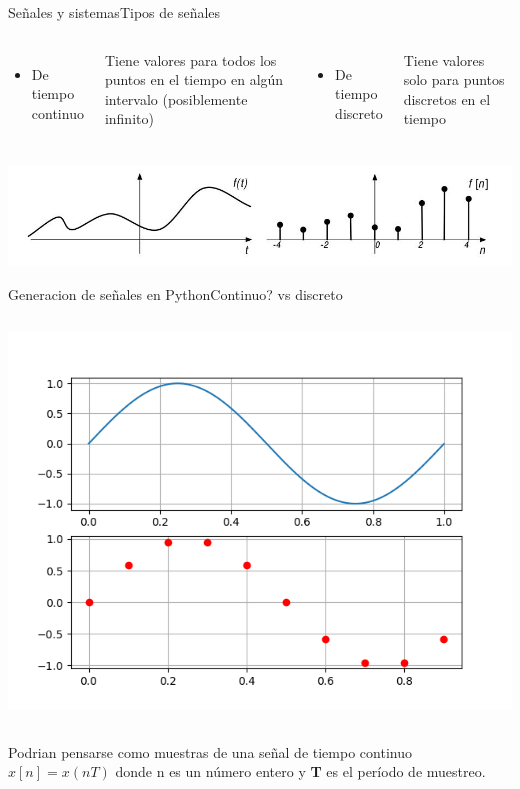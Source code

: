  \begin{frame}{Señales y sistemas}{Tipos de señales}
    \begin{columns}[onlytextwidth]
       \begin{itemize}
          \item{De tiempo continuo}
       \end{itemize}
       Tiene valores para todos los puntos en el tiempo en algún intervalo (posiblemente infinito)
       \begin{itemize}
          \item{De tiempo discreto}
       \end{itemize}
       Tiene valores solo para puntos discretos en el tiempo
    \end{columns}
    \vfill
    \includegraphics[width=\textwidth]{1_clase/continuo_vs_discreto}
 \end{frame}
 \begin{frame}{Generacion de señales en Python}{Continuo? vs discreto}
    \begin{columns}[onlytextwidth]
       
       \includegraphics[width=\textwidth]{1_clase/python_continuo_vs_discreto}
    \end{columns}
    Podrian pensarse como muestras de una señal de tiempo continuo $x[n] = x (nT)$ donde n es un número entero y \textbf{T} es el período de muestreo.
    \vfill
 \end{frame}
